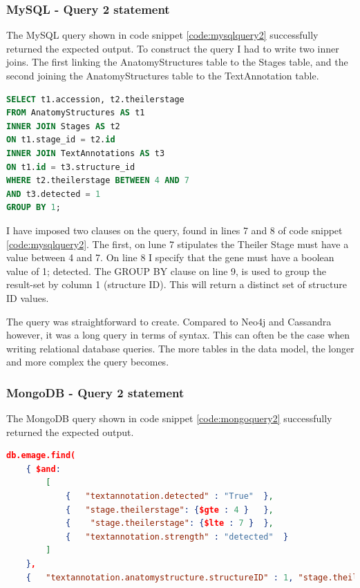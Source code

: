 \subsubsection*{MySQL - Query 2 statement}\label{mysqlquery2statement}
The MySQL query shown in code snippet \ref{code:mysqlquery2} successfully returned the expected output. To construct the query I had to write two inner joins. The first linking the AnatomyStructures table to the Stages table, and the second joining the AnatomyStructures table to the TextAnnotation table.

\begin{lstlisting}[language=SQL, caption=MySQL query 2 statement. All structures between Theiler Stage X and Y., label=code:mysqlquery2]
SELECT t1.accession, t2.theilerstage
FROM AnatomyStructures AS t1
INNER JOIN Stages AS t2
ON t1.stage_id = t2.id
INNER JOIN TextAnnotations AS t3
ON t1.id = t3.structure_id
WHERE t2.theilerstage BETWEEN 4 AND 7
AND t3.detected = 1
GROUP BY 1;
\end{lstlisting}

I have imposed two clauses on the query, found in lines 7 and 8 of code snippet \ref{code:mysqlquery2}. The first, on lune 7 stipulates the Theiler Stage must have a value between 4 and 7. On line 8 I specify that the gene must have a boolean value of 1; detected. The GROUP BY clause on line 9, is used to group the result-set by column 1 (structure ID). This will return a distinct set of structure ID values.

The query was straightforward to create. Compared to Neo4j and Cassandra however, it was a long query in terms of syntax. This can often be the case when writing relational database queries. The more tables in the data model, the longer and more complex the query becomes.

\subsubsection*{MongoDB - Query 2 statement}\label{mongoquery2statement}
The MongoDB query shown in code snippet \ref{code:mongoquery2} successfully returned the expected output.

\parindent 0pt
\begin{lstlisting}[language=json, caption=MongoDB query 2 statement. All structures between Theiler Stage X and Y., label=code:mongoquery2]
db.emage.find(
	{ $and:
		[
			{	"textannotation.detected" : "True"	},
			{	"stage.theilerstage": {$gte : 4 }	},
			{	 "stage.theilerstage": {$lte : 7 }	},
			{	"textannotation.strength" : "detected"	}
		]
	},
	{	"textannotation.anatomystructure.structureID" : 1, "stage.theilerstage" : 1, "_id" : 0	}	).pretty();
\end{lstlisting}

